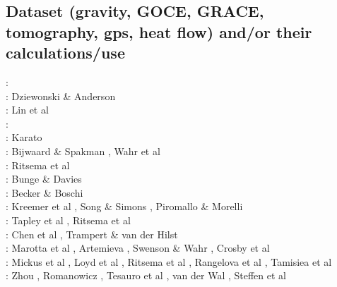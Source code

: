 \subsection{Dataset (gravity, GOCE, GRACE, tomography, gps, heat flow) 
and/or their calculations/use}

\begin{scriptsize}
\nineteenseventyseven: \cite{rola77}\\
\nineteeneightyone: Dziewonski \& Anderson \cite{dzan81}\\
\nineteenninety: Lin et al \cite{lips90}\\
\nineteenninetyone: \cite{spak91}\\
\nineteenninetythree: Karato \cite{kara93}\\
\nineteenninetyeight: Bijwaard \& Spakman \cite{bisp98}, Wahr et al \cite{wamb98}\\
\nineteenninetynine: Ritsema et al \cite{rivw99}\\
\twothousandone: Bunge \& Davies \cite{buda01}\\
\twothousandtwo: Becker \& Boschi \cite{bebo02}\\
\twothousandthree: Kreemer et al \cite{krhh03}, Song \& Simons \cite{sosi03}, 
Piromallo \& Morelli \cite{pimo03}\\
\twothousandfour: Tapley et al \cite{tabr04}, Ritsema et al \cite{rivw04}\\
\twothousandfive: Chen et al \cite{chrw05}, Trampert \& van der Hilst \cite{trva05}\\
\twothousandsix: Marotta et al \cite{masr06}, Artemieva \cite{arte06}, Swenson \& Wahr \cite{swwa06}, Crosby et al \cite{crms06}\\
\twothousandseven: Mickus et al \cite{mitk07}, Loyd et al \cite{lobc07}, Ritsema et al \cite{rimb07}, 
Rangelova et al \cite{ravb07}, Tamisiea et al \cite{tamd07}\\
\twothousandeight: Zhou \cite{zhou08}, Romanowicz \cite{roma08}, Tesauro et al \cite{tekc08}, van der Wal \cite{vaws08}, 
Steffen et al \cite{stdm08}\\

\end{scriptsize}
